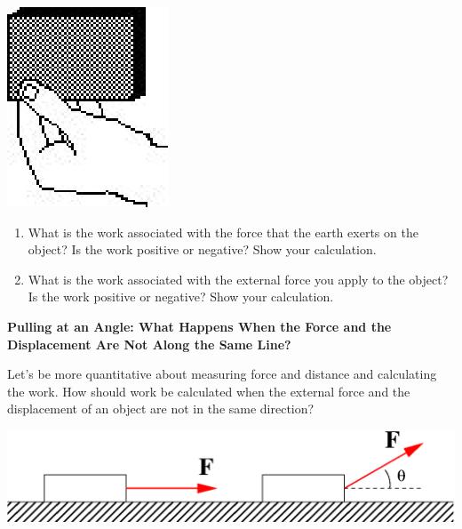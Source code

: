\vspace{0.3cm}
{\par\centering \includegraphics{work_power/work_power_fig5.eps} \par}
\vspace{0.3cm}

\begin{enumerate}
\item What is the work associated with the force that the earth exerts on the object? Is the work positive or negative? Show your calculation.
\answerspace{20mm}

\item What is the work associated with the external force you apply to the object? Is the work positive or negative? Show your calculation.
\answerspace{20mm}

\end{enumerate}
\textbf{Pulling at an Angle: What Happens When the Force and the Displacement
Are Not Along the Same Line? }

Let's be more quantitative about measuring force and distance and calculating
the work. How should work be calculated when the external force and the 
displacement of an object are not in the same direction?

\vspace{0.3cm}
{\par\centering \includegraphics{work_power/work_power_fig6b.eps} \par}
\vspace{0.3cm}

